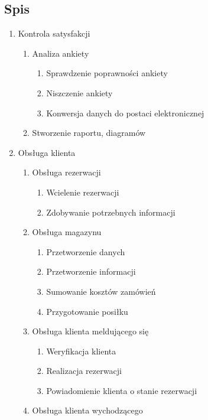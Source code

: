 \documentclass[a4paper, 11pt]{article}
\begin{document}
	\subsection{Spis}
		\begin{enumerate}[label*=\arabic*.]
		\item Kontrola satysfakcji
		\begin{enumerate}[label*=\arabic*.]
			\item Analiza ankiety
			\begin{enumerate}[label*=\arabic*.]
				\item Sprawdzenie poprawności ankiety
				\item Niszczenie ankiety
				\item Konwersja danych do postaci elektronicznej
			\end{enumerate}
			\item Stworzenie raportu, diagramów
		\end{enumerate}
		\item Obsługa klienta
		\begin{enumerate}[label*=\arabic*.]
			\item Obsługa rezerwacji
			\begin{enumerate}[label*=\arabic*.]
				\item Wcielenie rezerwacji
				\item Zdobywanie potrzebnych informacji
			\end{enumerate}
			\item Obsługa magazynu
			\begin{enumerate}[label*=\arabic*.]
				\item Przetworzenie danych
				\item Przetworzenie informacji
				\item Sumowanie kosztów zamówień
				\item Przygotowanie posiłku
			\end{enumerate}						
			\item Obsługa klienta meldującego się 
			\begin{enumerate}[label*=\arabic*.]
				\item Weryfikacja klienta
				\item Realizacja rezerwacji
				\item Powiadomienie klienta o stanie rezerwacji
			\end{enumerate}									
			\item Obsługa klienta wychodzącego
			\begin{enumerate}[label*=\arabic*.]

\end{enumerate}
\end{enumerate}
\end{enumerate}
\end{document}
